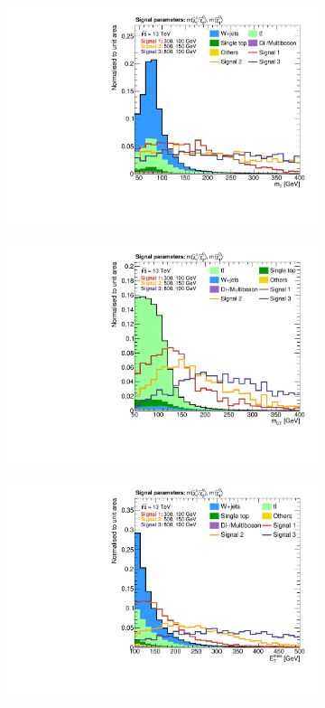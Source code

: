 \begin{figure}
	\centering
	\begin{subfigure}[b]{0.49\linewidth}
		\centering\includegraphics[width=\textwidth]{presel/mt}
		\caption{\label{fig:norm_mt}}
	\end{subfigure}\hfill
	\begin{subfigure}[b]{0.49\linewidth}
		\centering\includegraphics[width=\textwidth]{presel/mct}
		\caption{\label{fig:norm_mct}}
	\end{subfigure}
	\begin{subfigure}[b]{0.49\linewidth}
		\centering\includegraphics[width=\textwidth]{presel/met}

\end{subfigure}
\end{figure}
